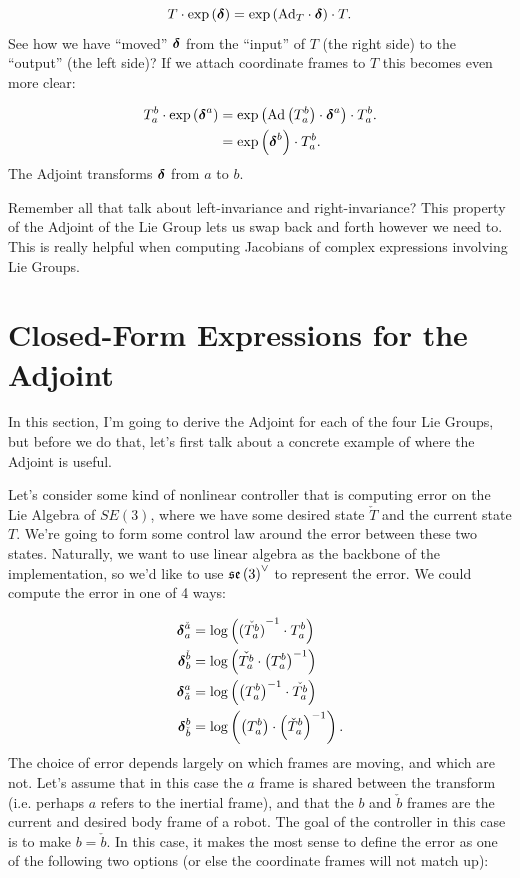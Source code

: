 \[
T\cdot\exp\left(\boldsymbol{\delta}\right)=\exp\left(\textnormal{Ad}_{T}\cdot\boldsymbol{\delta}\right)\cdot T.
\]
See how we have ``moved'' $\boldsymbol{\delta}$ from the ``input'' of $T$ (the
right side) to the ``output'' (the left side)? If we attach coordinate
frames to $T$ this becomes even more clear: 

\begin{align}
T_{a}^{b}\cdot\exp\left(\deltabf^{a}\right) & =\exp\left(\Ad\left(T_{a}^{b}\right)\cdot\deltabf^{a}\right)\cdot T_{a}^{b}.\nonumber \\
 & =\exp\left(\deltabf^{b}\right)\cdot T_{a}^{b}.\label{eq:adjoint_show}
\end{align}
The Adjoint transforms $\boldsymbol{\delta}$ from $a$ to $b.$

Remember all that talk about left-invariance and right-invariance?
This property of the Adjoint of the Lie Group lets us swap back and
forth however we need to. This is really helpful when computing Jacobians
of complex expressions involving Lie Groups.

\section{Closed-Form Expressions for the Adjoint}

In this section, I'm going to derive the Adjoint for each of the four
Lie Groups, but before we do that,\emph{ }let's first talk about a
concrete example of where the Adjoint is useful. 

Let's consider some kind of nonlinear controller that is computing
error on the Lie Algebra of $SE(3)$, where we have some
desired state $\check{T}$ and the current state $T.$ We're going
to form some control law around the error between these two states.
Naturally, we want to use linear algebra as the backbone of the implementation,
so we'd like to use $\mathfrak{se}\left(3\right)^{\vee}$ to represent the error.
We could compute the error in one of 4 ways:

\begin{align*}
\boldsymbol{\delta}_{a}^{\check{a}} & =\log\left(\check{\left(T_{a}^{b}\right)}^{-1}\cdot T_{a}^{b}\right)\\
\boldsymbol{\delta}_{b}^{\check{b}} & =\log\left(\check{T_{a}^{b}}\cdot\left(T_{a}^{b}\right)^{-1}\right)\\
\boldsymbol{\delta}_{\check{a}}^{a} & =\log\left(\left(T_{a}^{b}\right)^{-1}\cdot\check{T_{a}^{b}}\right)\\
\boldsymbol{\delta}_{\check{b}}^{b} & =\log\left(\left(T_{a}^{b}\right)\cdot\left(\check{T}_{a}^{b}\right)^{-1}\right).
\end{align*}
The choice of error depends largely on which frames are moving, and
which are not. Let's assume that in this case the $a$ frame is shared
between the transform (i.e. perhaps $a$ refers to the inertial frame),
and that the $b$ and $\check{b}$ frames are the current and desired
body frame of a robot. The goal of the controller in this case is
to make $b=\check{b}.$ In this case, it makes the most sense to define
the error as one of the following two options (or else the coordinate
frames will not match up):

